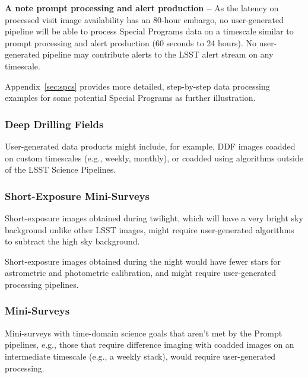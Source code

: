 \textbf{A note prompt processing and alert production -- }
As the latency on processed visit image availability has an 80-hour
embargo, no user-generated pipeline will be able to process Special Programs 
data on a timescale similar to prompt processing and alert production 
(60 seconds to 24 hours).
No user-generated pipeline may contribute alerts to the LSST alert stream on 
any timescale.

Appendix~\ref{sec:spcs} provides more detailed, step-by-step data processing examples 
for some potential Special Programs as further illustration.

\subsubsection{Deep Drilling Fields}

User-generated data products might include, for example, DDF images coadded on custom 
timescales (e.g., weekly, monthly), or coadded using algorithms outside of the LSST 
Science Pipelines.


\subsubsection{Short-Exposure Mini-Surveys}

Short-exposure images obtained during twilight, which will have a very bright sky 
background unlike other LSST images, might require user-generated algorithms to 
subtract the high sky background. 

Short-exposure images obtained during the night would have fewer stars for 
astrometric and photometric calibration, and might require user-generated 
processing pipelines.


\subsubsection{Mini-Surveys}

Mini-surveys with time-domain science goals that aren't met by the Prompt pipelines, 
e.g., those that require difference imaging with coadded images on an intermediate 
timescale (e.g., a weekly stack), would require user-generated processing.
